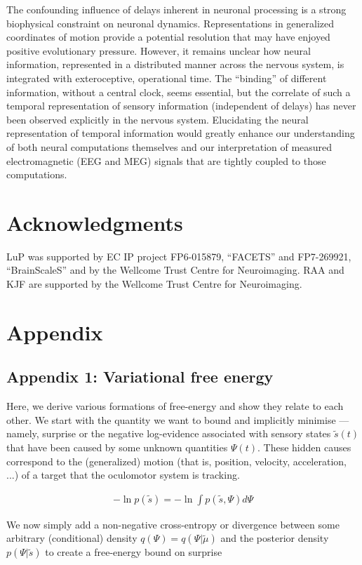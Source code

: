 \documentclass[a4paper]{article} %
\newcommand{\Acknowledgments}{
LuP was supported by EC IP project FP6-015879, ``FACETS'' and FP7-269921, ``BrainScaleS'' and by the Wellcome Trust Centre for Neuroimaging. RAA and KJF are supported by the Wellcome Trust Centre for Neuroimaging. %
}%
\begin{document}
The confounding influence of delays inherent in neuronal processing is a
strong biophysical constraint on neuronal dynamics. Representations in
generalized coordinates of motion provide a potential resolution that
may have enjoyed positive evolutionary pressure. However, it remains
unclear how neural information, represented in a distributed manner
across the nervous system, is integrated with exteroceptive, operational
time. The ``binding'' of different information, without a central clock,
seems essential, but the correlate of such a temporal representation of
sensory information (independent of delays) has never been observed
explicitly in the nervous system. Elucidating the neural representation
of temporal information would greatly enhance our understanding of both
neural computations themselves and our interpretation of measured
electromagnetic (EEG and MEG) signals that are tightly coupled to those
computations.

\section*{Acknowledgments}
\Acknowledgments
\section{Appendix}
\subsection{Appendix 1: Variational free energy}


Here, we derive various formations of free-energy and show they relate to each other. We start with the quantity we want to bound and implicitly minimise --- namely, surprise or the negative log-evidence associated with sensory states $\tilde{s}(t)$ that have been caused by some unknown quantities $\Psi(t)$. These hidden causes correspond to the (generalized) motion (that is, position, velocity, acceleration, ...) of a target that the oculomotor system is tracking.

\begin{align}
- \ln p(\tilde{s}) = - \ln  \int p(\tilde{s} , \Psi) d \Psi \label{eq:app1-1}
\end{align}%

We now simply add a non-negative cross-entropy or divergence between some arbitrary (conditional) density $q(\Psi)=q(\Psi | \tilde{\mu})$ and the posterior density $p(\Psi | \tilde{s})$ to create a free-energy bound on surprise 
\end{document}

